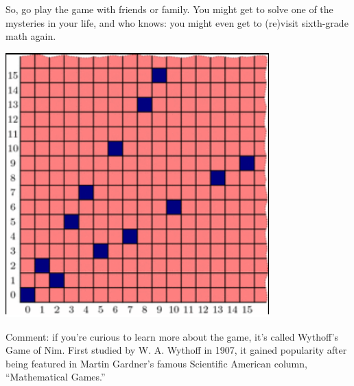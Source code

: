 \documentclass{article}
\begin{document}
So, go play the game with friends or family. You might get to solve one of the mysteries in your life, and who knows: you might even get to (re)visit sixth-grade math again.

\begin{center}
    \includegraphics[width=4in]{images/wythoff_game.png}
\end{center}

Comment: if you’re curious to learn more about the game, it’s called Wythoff’s Game of Nim. First studied by W. A. Wythoff in 1907, it gained popularity after being featured in Martin Gardner’s famous Scientific American column, “Mathematical Games.”
\end{document}
